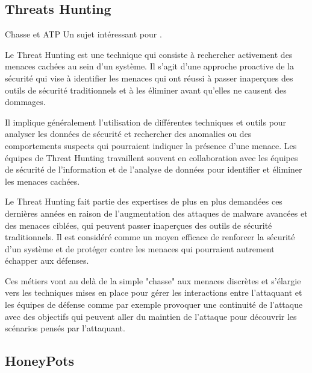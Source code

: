 \subsection{Threats Hunting}


\begin{techworkbox}{Chasse et ATP}
Un sujet intéressant pour \fichetech. 
\end{techworkbox}

Le Threat Hunting est une technique qui consiste à rechercher activement des menaces cachées au sein d'un système. Il s'agit d'une approche proactive de la sécurité qui vise à identifier les menaces qui ont réussi à passer inaperçues des outils de sécurité traditionnels et à les éliminer avant qu'elles ne causent des dommages.

Il implique généralement l'utilisation de différentes techniques et outils pour analyser les données de sécurité et rechercher des anomalies ou des comportements suspects qui pourraient indiquer la présence d'une menace. Les équipes de Threat Hunting travaillent souvent en collaboration avec les équipes de sécurité de l'information et de l'analyse de données pour identifier et éliminer les menaces cachées.

Le Threat Hunting fait partie des expertises de plus en plus demandées ces dernières années en raison de l'augmentation des attaques de malware avancées et des menaces ciblées, qui peuvent passer inaperçues des outils de sécurité traditionnels. Il est considéré comme un moyen efficace de renforcer la sécurité d'un système et de protéger contre les menaces qui pourraient autrement échapper aux défenses.

Ces métiers vont au delà de la simple "chasse" aux menaces discrètes et s'élargie vers les techniques mises en place pour gérer les interactions entre l'attaquant et les équipes de défense comme par exemple provoquer une continuité de l'attaque avec des objectifs qui peuvent aller du maintien de l'attaque pour découvrir les scénarios pensés par l'attaquant.
%

\subsection{HoneyPots}

